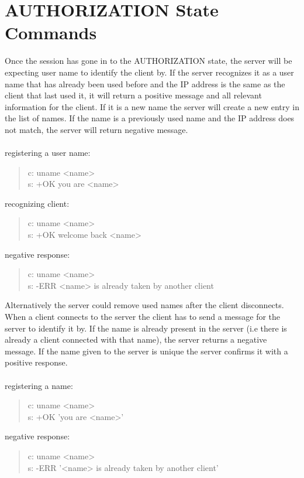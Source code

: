 \documentclass[a4paper,11pt]{article}
\begin{document}
\section{AUTHORIZATION State Commands}
Once the session has gone in to the AUTHORIZATION state, the server will be expecting user name to identify the client by. If the server recognizes it as a user name that has already been used before and the IP address is the same as the client that last used it, it will return a positive message and all relevant information for the client. If it is a new name the server will create a new entry in the list of names. If the name is a previously used name and the IP address does not match, the server will return negative message.\\\\
registering a user name:
\begin{quote}
  c: uname <name>\\
  s: +OK you are <name>
\end{quote}
\noindent
recognizing client:
\begin{quote}
  c: uname <name>\\
  s: +OK welcome back <name>
\end{quote}
\noindent
negative response:
\begin{quote}
  c: uname <name>\\
  s: -ERR <name> is already taken by another client
\end{quote}


Alternatively the server could remove used names after the client disconnects. When a client connects to the server the client has to send a message for the server to identify it by. If the name is already present in the server (i.e there is already a client connected with that name), the server returns a negative message. If the name given to the server is unique the server confirms it with a positive response.\\\\
registering a name:

\begin{quote}
  c: uname <name>\\
  s: +OK 'you are <name>'
\end{quote}
\noindent
negative response:
\begin{quote}
  c: uname <name>\\
  s: -ERR '<name> is already taken by another client'
\end{quote}


\clearpage
\end{document}
